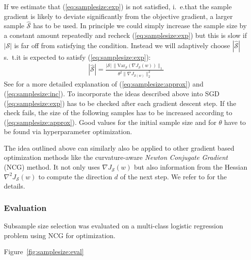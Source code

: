 If we estimate that (\ref{eq:samplesize:exp}) is not satisfied, i.~e.\@ that the sample gradient is likely to deviate significantly from the objective gradient, a larger sample \(\widehat{\mathcal{S}}\) has to be used.
In principle we could simply increase the sample size by a constant amount repeatedly and recheck (\ref{eq:samplesize:exp}) but this is slow if \(|\mathcal{S}|\) is far off from satisfying the condition.
Instead we will adaptively choose \(|\widehat{\mathcal{S}}|\) s.~t.\@ it is expected to satisfy (\ref{eq:samplesize:exp}):
\begin{align}
	|\widehat{\mathcal{S}}| = \frac{|\mathcal{S}|\, \|\mathrm{Var}_{\mathcal{S}}(\nabla J_{\mathcal{S}}(w))\|_1}{\theta^2 \|\nabla J_{\mathcal{S}(w)}\|_2^2}\label{eq:samplesize:inc}
\end{align}
See \citet[chapter~3]{Byrd2012} for a more detailed explanation of (\ref{eq:samplesize:approx}) and (\ref{eq:samplesize:inc}).
To incorporate the ideas described above into SGD (\ref{eq:samplesize:exp}) has to be checked after each gradient descent step.
If the check fails, the size of the following samples has to be increased according to (\ref{eq:samplesize:approx}).
Good values for the initial sample size and for \(\theta\) have to be found via hyperparameter optimization.

The idea outlined above can similarly also be applied to other gradient based optimization methods like the curvature-aware \textit{Newton Conjugate Gradient} (NCG) method.
It not only uses \(\nabla J_{\mathcal{S}}(w)\) but also information from the Hessian \(\nabla^2 J_{\mathcal{S}}(w)\) to compute the direction \(d\) of the next step.
We refer to \citet[chapter~5]{Byrd2012} for the details.

\subsubsection{Evaluation}%
\label{sec:params:samplesize:eval}

Subsample size selection was evaluated on a multi-class logistic regression problem using NCG for optimization.

Figure~\ref{fig:samplesize:eval}

